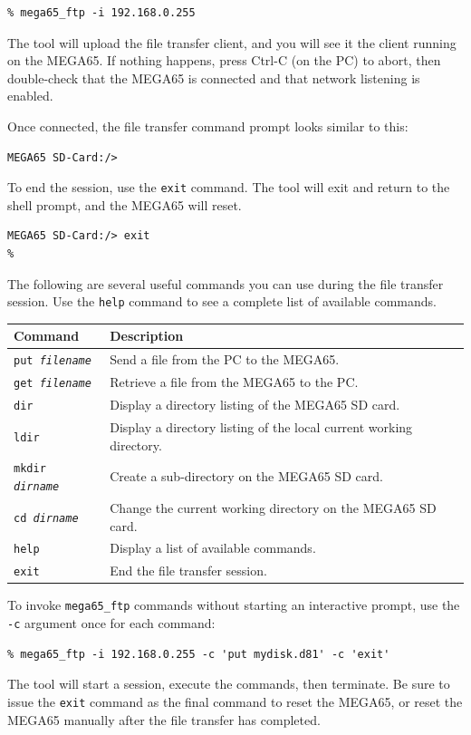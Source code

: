 \begin{verbatim}
% mega65_ftp -i 192.168.0.255
\end{verbatim}

The tool will upload the file transfer client, and you will see it the client running on the MEGA65. If nothing happens, press Ctrl-C (on the PC) to abort, then double-check that the MEGA65 is connected and that network listening is enabled.

Once connected, the file transfer command prompt looks similar to this:

\begin{verbatim}
MEGA65 SD-Card:/>
\end{verbatim}

To end the session, use the {\tt exit} command. The tool will exit and return to the shell prompt, and the MEGA65 will reset.

\begin{verbatim}
MEGA65 SD-Card:/> exit
%
\end{verbatim}

The following are several useful commands you can use during the file transfer session. Use the {\tt help} command to see a complete list of available commands.

\begin{center}
\begin{tabular}{|l|l|}
\hline
{\bf Command} & {\bf Description} \\
\hline
{\tt put {\it filename}} & Send a file from the PC to the MEGA65. \\
\hline
{\tt get {\it filename}} & Retrieve a file from the MEGA65 to the PC. \\
\hline
{\tt dir} & Display a directory listing of the MEGA65 SD card. \\
\hline
{\tt ldir} & Display a directory listing of the local current working directory. \\
\hline
{\tt mkdir {\it dirname}} & Create a sub-directory on the MEGA65 SD card. \\
\hline
{\tt cd {\it dirname}} & Change the current working directory on the MEGA65 SD card. \\
\hline
{\tt help} & Display a list of available commands. \\
\hline
{\tt exit} & End the file transfer session. \\
\hline
\end{tabular}
\end{center}

To invoke {\tt mega65\_ftp} commands without starting an interactive prompt, use the {\tt -c} argument once for each command:

\begin{verbatim}
% mega65_ftp -i 192.168.0.255 -c 'put mydisk.d81' -c 'exit'
\end{verbatim}

The tool will start a session, execute the commands, then terminate. Be sure to issue the {\tt exit} command as the final command to reset the MEGA65, or reset the MEGA65 manually after the file transfer has completed.
